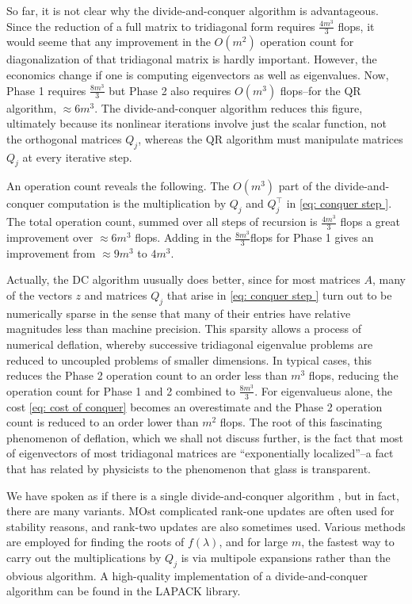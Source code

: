 So far, it is not clear why the divide-and-conquer algorithm is advantageous. Since the reduction of a full matrix to tridiagonal form requires $ \frac{4m^3}{3} $ flops, it would seeme that any improvement in the $ O(m^{2} ) $ operation count for diagonalization of that tridiagonal matrix is hardly important. However, the economics change if one is computing eigenvectors as well as eigenvalues. Now, Phase 1 requires $ \frac{8m^3}{3} $ but Phase 2 also requires $ O(m^{3}) $ flops--for the QR algorithm, $ \approx 6m^{3} $. The divide-and-conquer algorithm reduces this figure, ultimately because its nonlinear iterations involve just the scalar function, not the orthogonal matrices $ Q_j $, whereas the QR algorithm must manipulate matrices $ Q_j $ at every iterative step.  

An operation count reveals the following. The $ O(m^{3}) $ part of the divide-and-conquer computation is the multiplication by $ Q_j $ and $ Q_j^\top  $ in \eqref{eq: conquer step }. The total operation count, summed over all steps of recursion is $ \frac{4m^3}{3} $ flops a great improvement over $ \approx 6m^{3} $ flops. Adding in the $ \frac{8m^3}{3} $flops for Phase 1 gives an improvement from $ \approx 9m^3 $ to $ 4m^3 $. 

Actually, the DC algorithm uusually does better, since for most matrices $ A $, many of the vectors $ z $ and matrices $ Q_j $ that arise in \eqref{eq: conquer step } turn out to be numerically sparse in the sense that many of their entries have relative magnitudes less than machine precision. This sparsity allows a process of numerical deflation, whereby successive tridiagonal eigenvalue problems are reduced to uncoupled problems of smaller dimensions. In typical cases, this reduces the Phase 2 operation count to an order less than $ m^{3} $ flops, reducing the operation count for Phase 1 and 2 combined to $ \frac{8m^3}{3} $. For eigenvalueus alone, the cost \eqref{eq: cost of conquer} becomes an overestimate and the Phase 2 operation count is reduced to an order lower than $ m^{2}  $ flops. The root of this fascinating phenomenon of deflation, which we shall not discuss further, is the fact that most of eigenvectors of most tridiagonal matrices are ``exponentially localized''--a fact that has related by physicists to the phenomenon that glass is transparent. 

We have spoken as if there is a single divide-and-conquer algorithm , but in fact, there are many variants. MOst complicated rank-one updates are often used for stability reasons, and rank-two updates are also sometimes used. Various methods are employed for finding the roots of $ f(\lambda ) $, and for large $ m $, the fastest way to carry out the multiplications by $ Q_j $ is via multipole expansions rather than the obvious algorithm. A high-quality implementation of a divide-and-conquer algorithm can be found in the LAPACK library.  